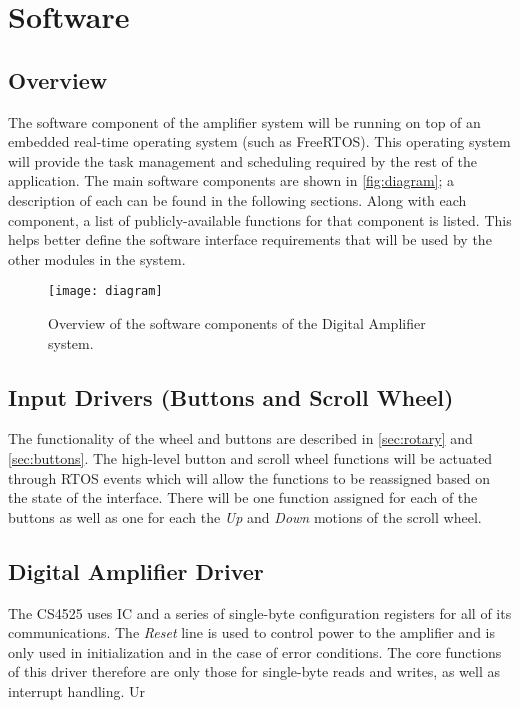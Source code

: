 \chapter{Software}

\section{Overview}
\label{sec:software-overview}
The software component of the amplifier system will be running on top of an embedded real-time operating system (such as FreeRTOS). This operating system will provide the task management and scheduling required by the rest of the application. The main software components are shown in \autoref{fig:diagram}; a description of each can be found in the following sections. Along with each component, a list of publicly-available functions for that component is listed. This helps better define the software interface requirements that will be used by the other modules in the system.

\begin{figure}[H]
	\centering
	\texttt{[image: diagram]}
	\caption[Software Componenent Overview]%
	{Overview of the software components of the Digital Amplifier system.}
	\label{fig:diagram}
\end{figure}

\section{Input Drivers (Buttons and Scroll Wheel)}
\label{sec:io-driver}
The functionality of the wheel and buttons are described in \autoref{sec:rotary} and \autoref{sec:buttons}. The high-level button and scroll wheel functions will be actuated through RTOS events which will allow the functions to be reassigned based on the state of the interface. There will be one function assigned for each of the buttons as well as one for each the \emph{Up} and \emph{Down} motions of the scroll wheel.

\section{Digital Amplifier Driver}
\label{sec:amp-driver}
The CS4525 uses IC and a series of single-byte configuration registers for all of its communications. The \emph{Reset} line is used to control power to the amplifier and is only used in initialization and in the case of error conditions. The core functions of this driver therefore are only those for single-byte reads and writes, as well as interrupt handling. Ur

